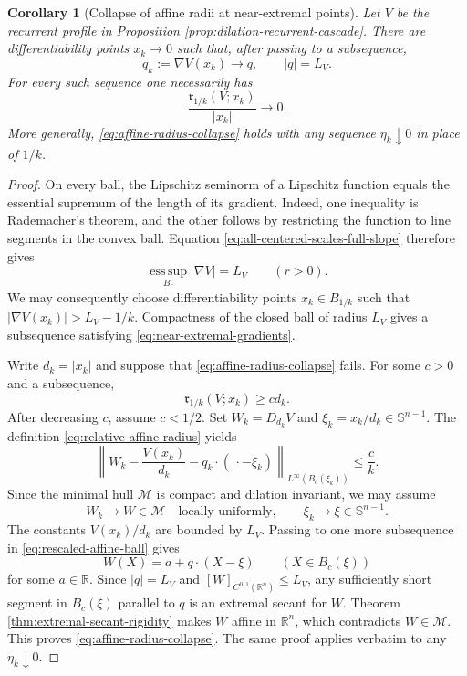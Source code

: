 \documentclass[11pt,reqno]{amsart}
\numberwithin{equation}{section}
\newcommand{\R}{\mathbb R}
\newtheorem{corollary}[theorem]{Corollary}
\theoremstyle{remark}
\begin{document}
\begin{corollary}[Collapse of affine radii at near-extremal points]
\label{cor:collapse-affine-radii}
Let $V$ be the recurrent profile in Proposition
\ref{prop:dilation-recurrent-cascade}.  There are differentiability points
$x_k\to0$ such that, after passing to a subsequence,
\begin{equation}
 q_k:=\nabla V(x_k)\longrightarrow q,
 \qquad |q|=L_V.
 \label{eq:near-extremal-gradients}
\end{equation}
For every such sequence one necessarily has
\begin{equation}
 \frac{\mathfrak r_{1/k}(V;x_k)}{|x_k|}\longrightarrow0.
 \label{eq:affine-radius-collapse}
\end{equation}
More generally, \eqref{eq:affine-radius-collapse} holds with any sequence
$\eta_k\downarrow0$ in place of $1/k$.
\end{corollary}

\begin{proof}
On every ball, the Lipschitz seminorm of a Lipschitz function equals the
essential supremum of the length of its gradient.  Indeed, one inequality
is Rademacher's theorem, and the other follows by restricting the function
to line segments in the convex ball.  Equation
\eqref{eq:all-centered-scales-full-slope} therefore gives
\[
 \operatorname*{ess\,sup}_{B_r}|\nabla V|=L_V
 \qquad(r>0).
\]
We may consequently choose differentiability points $x_k\in B_{1/k}$ such
that $|\nabla V(x_k)|>L_V-1/k$.  Compactness of the closed ball of radius
$L_V$ gives a subsequence satisfying
\eqref{eq:near-extremal-gradients}.

Write $d_k=|x_k|$ and suppose that
\eqref{eq:affine-radius-collapse} fails.  For some $c>0$ and a subsequence,
\[
 \mathfrak r_{1/k}(V;x_k)\ge cd_k.
\]
After decreasing $c$, assume $c<1/2$.  Set
$W_k=D_{d_k}V$ and $\xi_k=x_k/d_k\in\mathbb S^{n-1}$.  The definition
\eqref{eq:relative-affine-radius} yields
\begin{equation}
 \left\|W_k-\frac{V(x_k)}{d_k}
 -q_k\cdot(\,\cdot-\xi_k)\right\|_{L^\infty(B_c(\xi_k))}
 \le\frac ck.
 \label{eq:rescaled-affine-ball}
\end{equation}
Since the minimal hull $\mathscr M$ is compact and dilation invariant,
we may assume
\[
 W_k\longrightarrow W\in\mathscr M
 \quad\text{locally uniformly},
 \qquad \xi_k\to\xi\in\mathbb S^{n-1}.
\]
The constants $V(x_k)/d_k$ are bounded by $L_V$.  Passing to one more
subsequence in \eqref{eq:rescaled-affine-ball} gives
\[
 W(X)=a+q\cdot(X-\xi)
 \qquad(X\in B_c(\xi))
\]
for some $a\in\R$.  Since $|q|=L_V$ and
$[W]_{C^{0,1}(\R^n)}\le L_V$, any sufficiently short segment in
$B_c(\xi)$ parallel to $q$ is an extremal secant for $W$.  Theorem
\ref{thm:extremal-secant-rigidity} makes $W$ affine in $\R^n$, which
contradicts $W\in\mathscr M$.  This proves
\eqref{eq:affine-radius-collapse}.  The same proof applies verbatim to
any $\eta_k\downarrow0$.
\end{proof}
\end{document}
